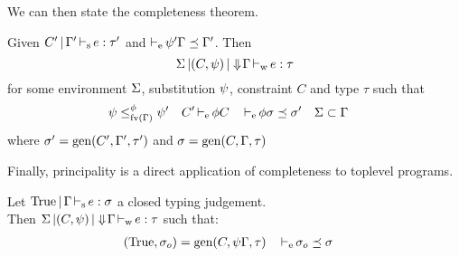 We can then state the completeness theorem.

\begin{theorem}[Completeness]
  Given $C' \operatorname{|} \Gamma' \operatorname{\vdash_s} e : \tau'$ and
  $\operatorname{\vdash_e} \mathrm{\psi}'\Gamma \preceq \Gamma'$.
  Then $$\Sigma \operatorname{|} (C,\mathrm{\psi}) \operatorname{|} \Downarrow\!\Gamma \operatorname{\vdash_w} e : \tau$$
  for some environment $\Sigma$,
  substitution $\mathrm{\psi}$, constraint $C$ and type $\tau$ such
  that
  \begin{align*}
    \mathrm{\psi} &\leq^{\phi}_{\operatorname{fv}(\Gamma)} \mathrm{\psi}'
    &C'& \operatorname{\vdash_e} \phi C
    && \operatorname{\vdash_e} \phi \sigma \preceq \sigma'
    &\Sigma&\subset\Gamma
  \end{align*}
  where $\sigma' = \operatorname{\text{gen}}(C',\Gamma',\tau')$
  and $\sigma = \operatorname{\text{gen}}(C,\Gamma,\tau)$
\end{theorem}

Finally, principality is a direct application of completeness to
toplevel programs.

\begin{corollary}[Principality]
  Let $\operatorname{True} \operatorname{|} \Gamma \operatorname{\vdash_s} e : \sigma$ a closed typing judgement.\\
  Then $\Sigma \operatorname{|} (C,\mathrm{\psi}) \operatorname{|} \Downarrow\!\Gamma \operatorname{\vdash_w} e : \tau$
  such that:
  \begin{align*}
    (\operatorname{True},\sigma_o) &= \operatorname{\text{gen}}(C,\mathrm{\psi}\Gamma,\tau)
    && \operatorname{\vdash_e} \sigma_o \preceq \sigma
  \end{align*}


\end{corollary}

